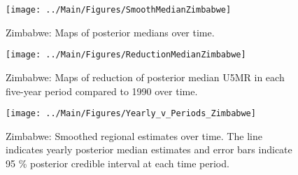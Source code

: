 \documentclass[12pt]{article}\usepackage[]{graphicx}\usepackage[]{color}
\newenvironment{knitrout}{}{} %
\begin{document}
\begin{knitrout}
\color{fgcolor}\begin{figure}[bht]

{\centering \texttt{[image: ../Main/Figures/SmoothMedianZimbabwe]} 

}

\caption[Zimbabwe]{Zimbabwe: Maps of posterior medians over time.}\label{fig:unnamed-chunk-344}
\end{figure}


\end{knitrout}
\begin{knitrout}
\color{fgcolor}\begin{figure}[bht]

{\centering \texttt{[image: ../Main/Figures/ReductionMedianZimbabwe]} 

}

\caption[Zimbabwe]{Zimbabwe: Maps of reduction of posterior median U5MR in each five-year period compared to 1990 over time.}\label{fig:unnamed-chunk-345}
\end{figure}


\end{knitrout}
\begin{knitrout}
\color{fgcolor}\begin{figure}[bht]

{\centering \texttt{[image: ../Main/Figures/Yearly\_v\_Periods\_Zimbabwe]} 

}

\caption[Zimbabwe]{Zimbabwe: Smoothed regional estimates over time. The line indicates yearly posterior median estimates and error bars indicate 95 \% posterior credible interval at each time period.}\label{fig:unnamed-chunk-346}
\end{figure}


\end{knitrout}
\end{document}
